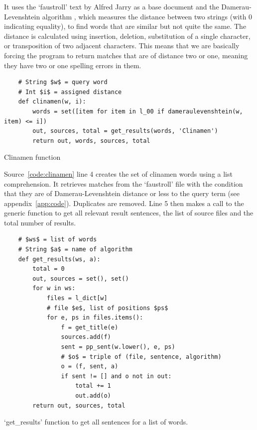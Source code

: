 
It uses the `faustroll' text by Alfred Jarry \citeyear{Jarry1996} as a base document and the Damerau-Levenshtein algorithm \parencite{Damerau1964, Levenshtein1966}, which measures the distance between two strings (with 0 indicating equality), to find words that are similar but not quite the same. The distance is calculated using insertion, deletion, substitution of a single character, or transposition of two adjacent characters. This means that we are basically forcing the program to return matches that are of distance two or one, meaning they have two or one spelling errors in them.

\begin{listing}
  \begin{verbatim}
    # String $w$ = query word
    # Int $i$ = assigned distance
    def clinamen(w, i):
        words = set([item for item in l_00 if dameraulevenshtein(w, item) <= i])
        out, sources, total = get_results(words, 'Clinamen')
        return out, words, sources, total
  \end{verbatim}
\caption{Clinamen function}
\label{code:clinamen}
\end{listing}

Source~\ref{code:clinamen} line 4 creates the set of clinamen words using a list comprehension. It retrieves matches from the `faustroll' file  with the condition that they are of Damerau-Levenshtein distance  or less to the query term  (see appendix~\ref{app:code}). Duplicates are removed. Line 5 then makes a call to the generic  function to get all relevant result sentences, the list of source files and the total number of results.

\begin{listing}
  \begin{verbatim}
    # $ws$ = list of words
    # String $a$ = name of algorithm
    def get_results(ws, a):
        total = 0
        out, sources = set(), set()
        for w in ws:
            files = l_dict[w]
            # file $e$, list of positions $ps$
            for e, ps in files.items():
                f = get_title(e)
                sources.add(f)
                sent = pp_sent(w.lower(), e, ps)
                # $o$ = triple of (file, sentence, algorithm)
                o = (f, sent, a)
                if sent != [] and o not in out:
                    total += 1
                    out.add(o)
        return out, sources, total
  \end{verbatim}
\caption{`get\_results' function to get all sentences for a list of words.}
\label{code:getresults}
\end{listing}

